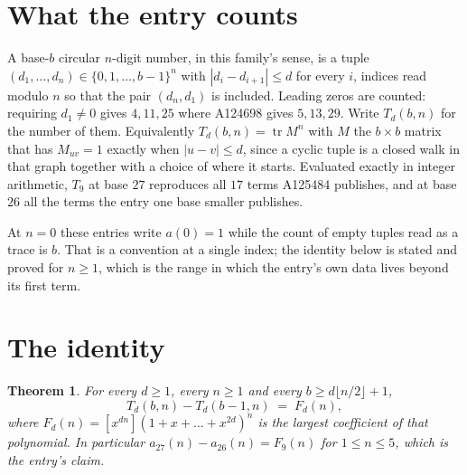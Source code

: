 \documentclass[11pt,a4paper]{article}
\theoremstyle{plain}
\newtheorem{theorem}{Theorem}
\theoremstyle{definition}
\begin{document}
\section{What the entry counts}

A base-$b$ circular $n$-digit number, in this family's sense, is a tuple
$(d_1,\dots,d_n)\in\{0,1,\dots,b-1\}^{n}$ with $|d_i-d_{i+1}|\le d$ for every $i$, indices
read modulo $n$ so that the pair $(d_n,d_1)$ is included. Leading zeros are counted: requiring
$d_1\ne0$ gives $4,11,25$ where A124698 gives $5,13,29$. Write $T_d(b,n)$ for the number of
them. Equivalently $T_d(b,n)=\operatorname{tr}M^{n}$ with $M$ the $b\times b$ matrix that has
$M_{uv}=1$ exactly when $|u-v|\le d$, since a cyclic tuple is a closed walk in that graph
together with a choice of where it starts. Evaluated exactly in integer arithmetic, $T_{9}$
at base $27$ reproduces all $17$ terms A125484 publishes, and at base $26$ all the
terms the entry one base smaller publishes.

At $n=0$ these entries write $a(0)=1$ while the count of empty tuples read as a trace is $b$.
That is a convention at a single index; the identity below is stated and proved for $n\ge1$,
which is the range in which the entry's own data lives beyond its first term.

\section{The identity}

\begin{theorem}
For every $d\ge1$, every $n\ge1$ and every $b\ge d\lfloor n/2\rfloor+1$,
\[
T_d(b,n)-T_d(b-1,n)\;=\;F_d(n),
\]
where $F_d(n)=[x^{dn}](1+x+\dots+x^{2d})^{n}$ is the largest coefficient of that
polynomial. In particular $a_{27}(n)-a_{26}(n)=F_{9}(n)$ for $1\le n\le5$, which
is the entry's claim.
\end{theorem}
\end{document}
